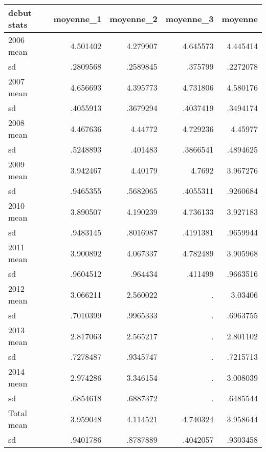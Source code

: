\begin{center}
\begin{tabular} {@{} l r r r r @{}} \\ \hline
\textbf{debut       stats } & \textbf{  moyenne\_1} & \textbf{  moyenne\_2} & \textbf{  moyenne\_3} & \textbf{   moyenne} \\
\hline
2006         mean  &   4.501402 &   4.279907 &   4.645573 &   4.445414 \\
               sd  &   .2809568 &   .2589845 &    .375799 &   .2272078 \\
2007         mean  &   4.656693 &   4.395773 &   4.731806 &   4.580176 \\
               sd  &   .4055913 &   .3679294 &   .4037419 &   .3494174 \\
2008         mean  &   4.467636 &    4.44772 &   4.729236 &    4.45977 \\
               sd  &   .5248893 &    .401483 &   .3866541 &   .4894625 \\
2009         mean  &   3.942467 &    4.40179 &     4.7692 &   3.967276 \\
               sd  &   .9465355 &   .5682065 &   .4055311 &   .9260684 \\
2010         mean  &   3.890507 &   4.190239 &   4.736133 &   3.927183 \\
               sd  &   .9483145 &   .8016987 &   .4191381 &   .9659944 \\
2011         mean  &   3.900892 &   4.067337 &   4.782489 &   3.905968 \\
               sd  &   .9604512 &    .964434 &    .411499 &   .9663516 \\
2012         mean  &   3.066211 &   2.560022 &          . &    3.03406 \\
               sd  &   .7010399 &   .9965333 &          . &   .6963755 \\
2013         mean  &   2.817063 &   2.565217 &          . &   2.801102 \\
               sd  &   .7278487 &   .9345747 &          . &   .7215713 \\
2014         mean  &   2.974286 &   3.346154 &          . &   3.008039 \\
               sd  &   .6854618 &   .6887372 &          . &   .6485544 \\
Total        mean  &   3.959048 &   4.114521 &   4.740324 &   3.958644 \\
               sd  &   .9401786 &   .8787889 &   .4042057 &   .9303458 \\
\hline
\end{tabular}
\end{center}